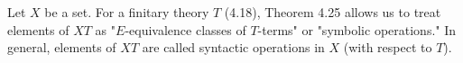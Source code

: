 Let $X$ be a set. For a finitary theory $T$ (4.18), Theorem 4.25 allows us to treat elements of $XT$ as "$E$-equivalence classes of $T$-terms" or "symbolic operations." In general, elements of $XT$ are called syntactic operations in $X$ (with respect to $T$).
